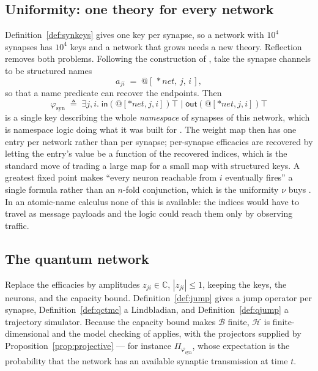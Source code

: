 \documentclass[11pt,a4paper]{article}
\theoremstyle{plain}
\theoremstyle{definition}
\theoremstyle{remark}
\newcommand{\sepc}{\mathbin{\big|}}
\newcommand{\out}{\mathsf{out}}
\newcommand{\inn}{\mathsf{in}}
\newcommand{\Cx}{\mathbb{C}}
\begin{document}
\subsection{Uniformity: one theory for every network}
\label{sec:rnn-uniform}

Definition~\ref{def:synkeys} gives one key per synapse, so a network with $10^4$ synapses has $10^4$
keys and a network that grows needs a new theory. Reflection removes both problems. Following the
construction of \cite{knots}, take the synapse channels to be structured names
\[
a_{ji} \;=\; @[\,*\mathit{net},\, j,\, i\,],
\]
so that a name predicate can recover the endpoints. Then
\[
\varphi_{\mathrm{syn}} \;\triangleq\; \exists j, i.\; \inn(@[*\mathit{net},j,i])\top \;\sepc\; \out(@[*\mathit{net},j,i])\top
\]
is a single key describing the whole \emph{namespace} of synapses of this network, which is
namespace logic doing what it was built for \cite{namespace}. The weight map then has one entry per
network rather than per synapse; per-synapse efficacies are recovered by letting the entry's value be
a function of the recovered indices, which is the standard move of trading a large map for a small
map with structured keys. A greatest fixed point makes ``every neuron reachable from $i$ eventually
fires'' a single formula rather than an $n$-fold conjunction, which is the uniformity $\nu$ buys
\cite[\S3]{classifier}. In an atomic-name calculus none of this is available: the indices would have
to travel as message payloads and the logic could reach them only by observing traffic.

\subsection{The quantum network}
\label{sec:rnn-quantum}

Replace the efficacies by amplitudes $z_{ji} \in \Cx$, $|z_{ji}| \leq 1$, keeping the keys, the
neurons, and the capacity bound. Definition~\ref{def:jump} gives a jump operator per synapse,
Definition~\ref{def:qctmc} a Lindbladian, and Definition~\ref{def:qjump} a trajectory simulator.
Because the capacity bound makes $\mathcal{B}$ finite, $\mathcal{H}$ is finite-dimensional and the
model checking of \cite{qctmc,qctmc-csl} applies, with the projectors supplied by
Proposition~\ref{prop:projective} --- for instance $\Pi_{\varphi_{\mathrm{syn}}}$, whose expectation
is the probability that the network has an available synaptic transmission at time $t$.
\end{document}
